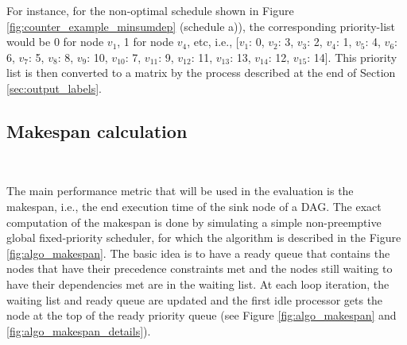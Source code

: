 For instance, for the non-optimal schedule shown in Figure \ref{fig:counter_example_minsumdep} (schedule a)),
the corresponding priority-list would be 0 for node $v_1$, 1 for node $v_4$,
etc, i.e., [$v_1$: 0, $v_2$: 3, $v_3$: 2, $v_4$: 1, $v_5$: 4, $v_6$: 6, $v_7$: 5, $v_8$: 8,
 $v_9$: 10, $v_10$: 7, $v_11$: 9, $v_12$: 11, $v_13$: 13, $v_14$: 12, $v_15$: 14].
This priority list is then converted to a matrix by the process described
at the end of Section \ref{sec:output_labels}.

\subsection{Makespan calculation}
~
\label{sec:makespan_calculation}

The main performance metric that will be used in the evaluation
is the makespan, i.e., the end execution time of the sink node of a DAG.
The exact computation of the makespan is done by simulating a 
simple non-preemptive global fixed-priority scheduler, for which the algorithm
is described in the Figure \ref{fig:algo_makespan}.
The basic idea is to have a ready queue that contains the nodes
that have their precedence constraints met
and the nodes still waiting to have their dependencies met 
are in the waiting list. At each loop iteration, the waiting list and ready queue
are updated and the first idle processor gets the node at the top of 
the ready priority queue (see Figure \ref{fig:algo_makespan} and \ref{fig:algo_makespan_details}).

